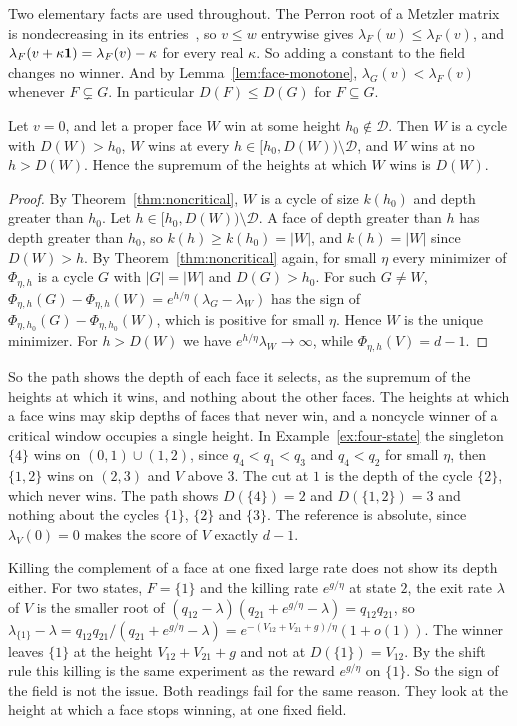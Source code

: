 Two elementary facts are used throughout. The Perron root of a Metzler matrix is
nondecreasing in its entries~\cite[Ch.~2]{bermanplemmons1994}, so $v\le w$
entrywise gives $\lambda_F(w)\le\lambda_F(v)$, and
$\lambda_F(v+\kappa\mathbf{1})=\lambda_F(v)-\kappa$ for every real $\kappa$. So
adding a constant to the field changes no winner. And by
Lemma~\ref{lem:face-monotone}, $\lambda_G(v)<\lambda_{F}(v)$ whenever
$F\subsetneq G$. In particular $D(F)\le D(G)$ for $F\subseteq G$.

\begin{proposition}\label{prop:unperturbed}
Let $v=0$, and let a proper face $W$ win at some height $h_0\notin\mathcal D$.
Then $W$ is a cycle with $D(W)>h_0$, $W$ wins at every
$h\in[h_0,D(W))\setminus\mathcal D$, and $W$ wins at no $h>D(W)$. Hence the
supremum of the heights at which $W$ wins is $D(W)$.
\end{proposition}

\begin{proof}
By Theorem~\ref{thm:noncritical}, $W$ is a cycle of size $k(h_0)$ and depth
greater than $h_0$. Let $h\in[h_0,D(W))\setminus\mathcal D$. A face of depth
greater than $h$ has depth greater than $h_0$, so $k(h)\ge k(h_0)=|W|$, and
$k(h)=|W|$ since $D(W)>h$. By Theorem~\ref{thm:noncritical} again, for small
$\eta$ every minimizer of $\Phi_{\eta,h}$ is a cycle $G$ with $|G|=|W|$ and
$D(G)>h_0$. For such $G\ne W$,
$\Phi_{\eta,h}(G)-\Phi_{\eta,h}(W)=e^{h/\eta}(\lambda_G-\lambda_W)$ has the sign
of $\Phi_{\eta,h_0}(G)-\Phi_{\eta,h_0}(W)$, which is positive for small $\eta$.
Hence $W$ is the unique minimizer. For $h>D(W)$ we have
$e^{h/\eta}\lambda_W\to\infty$, while $\Phi_{\eta,h}(V)=d-1$.
\end{proof}

So the path shows the depth of each face it selects, as the supremum of the
heights at which it wins, and nothing about the other faces. The heights at
which a face wins may skip depths of faces that never win, and a noncycle
winner of a critical window occupies a single height. In
Example~\ref{ex:four-state} the singleton $\{4\}$
wins on $(0,1)\cup(1,2)$, since $q_4<q_1<q_3$ and $q_4<q_2$ for small $\eta$,
then $\{1,2\}$ wins on $(2,3)$ and $V$ above $3$. The cut at $1$ is the depth
of the cycle $\{2\}$, which never wins. The path shows $D(\{4\})=2$ and
$D(\{1,2\})=3$ and nothing about the cycles $\{1\}$, $\{2\}$ and $\{3\}$. The
reference is absolute, since $\lambda_V(0)=0$ makes the score of $V$ exactly
$d-1$.

Killing the complement of a face at one fixed large rate does not show its
depth either. For two states, $F=\{1\}$ and the killing rate $e^{g/\eta}$ at state
$2$, the exit rate $\lambda$ of $V$ is the smaller root of
$(q_{12}-\lambda)(q_{21}+e^{g/\eta}-\lambda)=q_{12}q_{21}$, so
$\lambda_{\{1\}}-\lambda=q_{12}q_{21}/(q_{21}+e^{g/\eta}-\lambda)=e^{-(V_{12}+V_{21}+g)/\eta}(1+o(1))$.
The winner leaves $\{1\}$ at the height $V_{12}+V_{21}+g$ and not at
$D(\{1\})=V_{12}$. By the shift rule this killing is the same experiment as the
reward $e^{g/\eta}$ on $\{1\}$. So the sign of the field is not the issue. Both
readings fail for the same reason. They look at the height at which a face stops
winning, at one fixed field.

